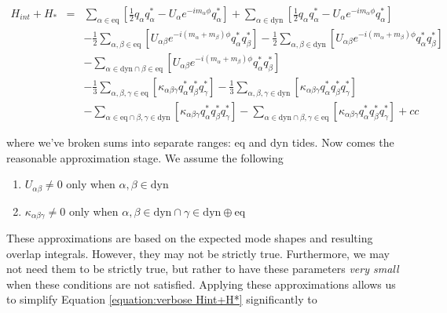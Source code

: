 \begin{eqnarray}\label{equation:verbose Hint+H*}
H_{int}+H_{\ast}  & = & \sum_{\alpha\in\mathrm{eq}} \left[\frac{1}{2} q_\alpha q_\alpha^\ast - U_\alpha e^{-im_\alpha\phi}q_\alpha^\ast\right] + \sum_{\alpha\in\mathrm{dyn}} \left[\frac{1}{2} q_\alpha q_\alpha^\ast - U_\alpha e^{-im_\alpha\phi}q_\alpha^\ast\right] \\
                  &  & - \frac{1}{2} \sum_{\alpha,\beta\in\mathrm{eq}} \left[ U_{\alpha\beta}e^{-i(m_\alpha+m_\beta)\phi}q_\alpha^\ast q_\beta^\ast \right] - \frac{1}{2}\sum_{\alpha,\beta\in\mathrm{dyn}} \left[ U_{\alpha\beta}e^{-i(m_\alpha+m_\beta)\phi}q_\alpha^\ast q_\beta^\ast \right] \\
                  &  & - \sum_{\alpha\in\mathrm{dyn}\cap\beta\in\mathrm{eq}} \left[ U_{\alpha\beta}e^{-i(m_\alpha+m_\beta)\phi}q_\alpha^\ast q_\beta^\ast \right] \\
                  &  & -\frac{1}{3}\sum_{\alpha,\beta,\gamma\in\mathrm{eq}} \left[\kappa_{\alpha\beta\gamma}q_\alpha^\ast q_\beta^\ast q_\gamma^\ast \right] - \frac{1}{3}\sum_{\alpha,\beta,\gamma\in\mathrm{dyn}} \left[\kappa_{\alpha\beta\gamma}q_\alpha^\ast q_\beta^\ast q_\gamma^\ast \right] \\
                  &  & -\sum_{\alpha\in\mathrm{eq}\cap\beta,\gamma\in\mathrm{dyn}} \left[\kappa_{\alpha\beta\gamma}q_\alpha^\ast q_\beta^\ast q_\gamma^\ast \right] -\sum_{\alpha\in\mathrm{dyn}\cap\beta,\gamma\in\mathrm{eq}} \left[\kappa_{\alpha\beta\gamma}q_\alpha^\ast q_\beta^\ast q_\gamma^\ast \right] + cc
\end{eqnarray}

where we've broken sums into separate ranges: $\mathrm{eq}$ and $\mathrm{dyn}$ tides. Now comes the reasonable approximation stage. We assume the following

\begin{enumerate}
  \item{$U_{\alpha\beta} \neq 0$ only when $\alpha,\beta\in\mathrm{dyn}$}
  \item{$\kappa_{\alpha\beta\gamma} \neq 0$ only when $\alpha,\beta\in\mathrm{dyn}\cap\gamma\in\mathrm{dyn}\oplus\mathrm{eq}$}
\end{enumerate}

These approximations are based on the expected mode shapes and resulting overlap integrals. However, they may not be strictly true. Furthermore, we may not need them to be strictly true, but rather to have these parameters \emph{very small} when these conditions are not satisfied. Applying these approximations allows us to simplify Equation \ref{equation:verbose Hint+H*} significantly to

